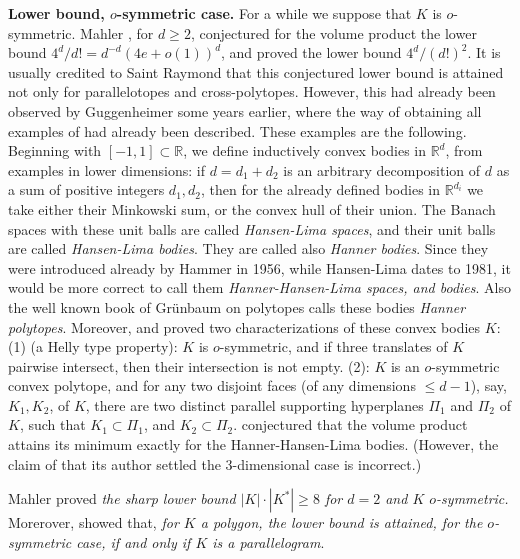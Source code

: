 \documentclass[12pt]{article}
\begin{document}
{\bf{Lower bound, $o$-symmetric case.}}
For a while we suppose that $K$ is $o$-symmetric.
Mahler \cite{Mah39}, for $d \ge 2$, conjectured for the volume product
the lower bound $4^d/d!=d^{-d}\left( 4e +o(1) \right) ^d$, 
and proved the lower bound $4^d/(d!)^2$. 
It is usually credited to Saint Raymond \cite{SR} 
that this conjectured lower bound is attained
not only for parallelotopes and cross-polytopes. However, this had
already been observed by Guggenheimer \cite{Gu} 
some years earlier, where the way of obtaining all examples of
\cite{SR} had already been 
described. These examples are the following. Beginning with $[-1,1] \subset
{\mathbb R}$, we define inductively convex bodies in ${\mathbb R}^d$, 
from examples in lower dimensions: if $d=d_1+d_2$ is an arbitrary
decomposition of $d$ as a sum of positive integers $d_1,d_2$, then
for the already defined bodies in ${\mathbb R}^{d_i}$ we take either their
Minkowski sum, or the convex hull of their union. The Banach spaces with
these unit balls are called {\it{Hansen-Lima spaces}}, and their unit balls are
called {\it{Hansen-Lima bodies}}.
They are called also {\it{Hanner bodies}}. 
Since they were introduced already by
Hammer \cite{Ha} in 1956, while Hansen-Lima \cite{HL} dates to 1981, it would
be more correct to call them {\it{Hanner-Hansen-Lima spaces, and bodies}}.
Also the well known book of Gr\"unbaum on polytopes \cite{Gru} 
calls these bodies {\emph{Hanner
polytopes}}. Moreover,
\cite{Ha} and \cite{HL} proved two characterizations of these convex bodies
$K$: (1) (a Helly type property): $K$ is $o$-symmetric, and if three translates
of $K$ pairwise intersect, then their intersection is not empty. (2): $K$ is
an $o$-symmetric convex polytope, and for any two disjoint faces (of any
dimensions $ \le d-1$), say, $K_1,K_2$, of $K$, there are two distinct parallel
supporting hyperplanes $\Pi _1$ and $\Pi _2$ of $K$, such that $K_1 \subset
\Pi _1$, and $K_2 \subset \Pi _2$.
\cite{SR} conjectured that the
volume product attains its minimum exactly for the Hanner-Hansen-Lima bodies. 
(However, the claim of \cite{Gu} that its author
settled the $3$-dimensional case is incorrect.) 

Mahler \cite{Mah38}
proved {\it{the sharp lower bound $|K| \cdot |K^*| \ge 8$ for $d=2$ and $K$
$o$-symmetric.}} 
Morerover, \cite{Mah38} showed that, {\it{for $K$ a
polygon, the lower bound is attained, for the $o$-symmetric case, 
if and only if $K$ is a parallelogram}}.
\end{document}
